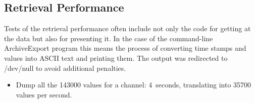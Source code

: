\subsection{Retrieval Performance}
Tests of the retrieval performance often include not only the
code for getting at the data but also for presenting it. In the
case of the command-line ArchiveExport program this means the process
of converting time stamps and values into ASCII text and printing them.
The output was redirected to /dev/null to avoid additional penalties.

\begin{itemize}
\item Dump all the 143000 values for a channel: 4~seconds,
      translating into 35700 values per second.
\end{itemize}